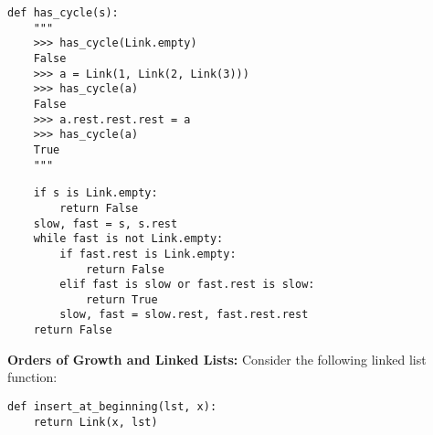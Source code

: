 \documentclass{exam}
\begin{document}
\begin{questions}
\begin{blocksection}
\begin{lstlisting}
def has_cycle(s):
    """
    >>> has_cycle(Link.empty)
    False
    >>> a = Link(1, Link(2, Link(3)))
    >>> has_cycle(a)
    False
    >>> a.rest.rest.rest = a
    >>> has_cycle(a)
    True
    """
\end{lstlisting}

\begin{solution}[1.00in]
\begin{lstlisting}
    if s is Link.empty:
        return False
    slow, fast = s, s.rest
    while fast is not Link.empty:
        if fast.rest is Link.empty:
            return False
        elif fast is slow or fast.rest is slow:
            return True
        slow, fast = slow.rest, fast.rest.rest
    return False
\end{lstlisting}
\end{solution}

\end{blocksection}

\begin{blocksection}
\question \textbf{Orders of Growth and Linked Lists:} Consider the following
linked list function:
\begin{lstlisting}
def insert_at_beginning(lst, x):
    return Link(x, lst)
\end{lstlisting}

\end{blocksection}
\end{questions}
\end{document}
